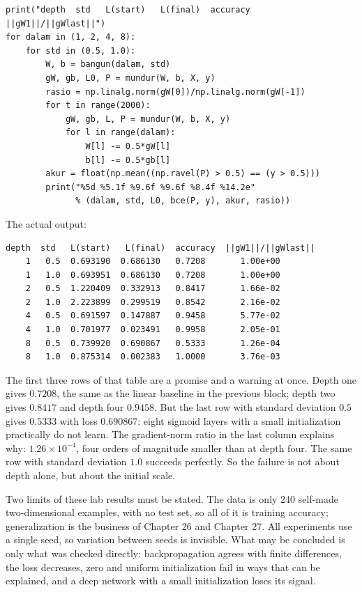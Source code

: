 \begin{lab}
\begin{verbatim}
print("depth  std   L(start)   L(final)  accuracy  ||gW1||/||gWlast||")
for dalam in (1, 2, 4, 8):
    for std in (0.5, 1.0):
        W, b = bangun(dalam, std)
        gW, gb, L0, P = mundur(W, b, X, y)
        rasio = np.linalg.norm(gW[0])/np.linalg.norm(gW[-1])
        for t in range(2000):
            gW, gb, L, P = mundur(W, b, X, y)
            for l in range(dalam):
                W[l] -= 0.5*gW[l]
                b[l] -= 0.5*gb[l]
        akur = float(np.mean((np.ravel(P) > 0.5) == (y > 0.5)))
        print("%5d %5.1f %9.6f %9.6f %8.4f %14.2e"
              % (dalam, std, L0, bce(P, y), akur, rasio))
\end{verbatim}
The actual output:
\begin{verbatim}
depth  std   L(start)   L(final)  accuracy  ||gW1||/||gWlast||
    1   0.5  0.693190  0.686130   0.7208       1.00e+00
    1   1.0  0.693951  0.686130   0.7208       1.00e+00
    2   0.5  1.220409  0.332913   0.8417       1.66e-02
    2   1.0  2.223899  0.299519   0.8542       2.16e-02
    4   0.5  0.691597  0.147887   0.9458       5.77e-02
    4   1.0  0.701977  0.023491   0.9958       2.05e-01
    8   0.5  0.739920  0.690867   0.5333       1.26e-04
    8   1.0  0.875314  0.002383   1.0000       3.76e-03
\end{verbatim}
\end{lab}

The first three rows of that table are a promise and a warning at once. Depth one gives $0.7208$,
the same as the linear baseline in the previous block; depth two gives $0.8417$ and depth four
$0.9458$. But the last row with standard deviation $0.5$ gives $0.5333$ with loss $0.690867$:
eight sigmoid layers with a small initialization practically do not learn. The gradient-norm
ratio in the last column explains why: $1.26\times10^{-4}$, four orders of magnitude smaller than
at depth four. The same row with standard deviation $1.0$ succeeds perfectly. So the failure is
not about depth alone, but about the initial scale.

Two limits of these lab results must be stated. The data is only 240 self-made two-dimensional
examples, with no test set, so all of it is training accuracy; generalization is the business of
Chapter 26 and Chapter 27. All experiments use a single seed, so variation between seeds is
invisible. What may be concluded is only what was checked directly: backpropagation agrees with
finite differences, the loss decreases, zero and uniform initialization fail in ways that can be
explained, and a deep network with a small initialization loses its signal.

